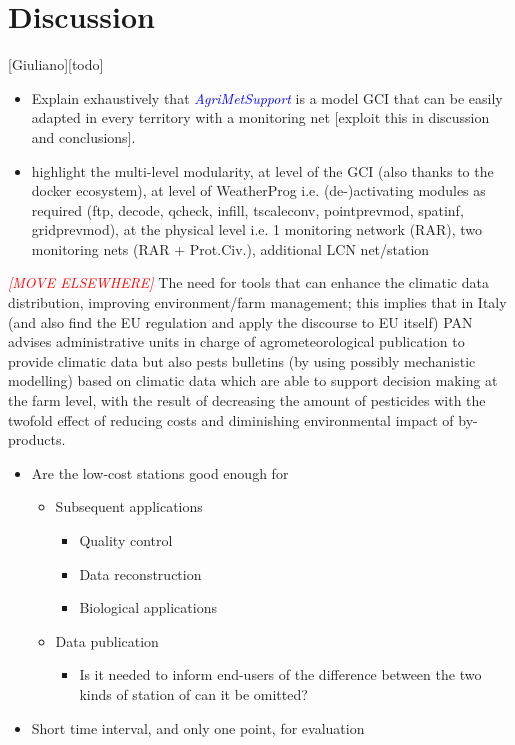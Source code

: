 \documentclass[authoryear,preprint,review,12pt]{elsarticle}
\newcommand{\note}[1]{\emph{\textcolor{red}{#1}}}
\newcommand{\update}[1]{\emph{\textcolor{blue}{#1}}}
\newcommand{\gci}{\update{AgriMetSupport}\xspace}
\begin{document}
\section{Discussion}[Giuliano][todo]
\begin{itemize}
    \item Explain exhaustively that \gci is a model GCI that can be easily adapted in every territory with a monitoring net [exploit this in discussion and conclusions].
    \item highlight the multi-level modularity, at level of the GCI (also thanks to the docker ecosystem), at level of WeatherProg i.e. (de-)activating modules as required (ftp, decode, qcheck, infill, tscaleconv, pointprevmod, spatinf, gridprevmod), at the physical level i.e. 1 monitoring network (RAR), two monitoring nets (RAR + Prot.Civ.), additional LCN net/station
\end{itemize}

\note{[MOVE ELSEWHERE]} The need for tools that can enhance the climatic data distribution, improving environment/farm management; this implies that in Italy (and also find the EU regulation and apply the discourse to EU itself) PAN advises administrative units in charge of agrometeorological publication to provide climatic data but also pests bulletins (by using possibly mechanistic modelling) based on climatic data which are able to support decision making at the farm level, with the result of decreasing the amount of pesticides with the twofold effect of reducing costs and diminishing environmental impact of by-products.

\begin{itemize}
    \item Are the low-cost stations good enough for
    \begin{itemize}
        \item Subsequent applications
        \begin{itemize}
            \item Quality control
            \item Data reconstruction
            \item Biological applications
        \end{itemize}
        \item Data publication
        \begin{itemize}
            \item Is it needed to inform end-users of the difference between the two kinds of station of can it be omitted?
        \end{itemize}
    \end{itemize}
    \item Short time interval, and only one point, for evaluation
\end{itemize}
\end{document}
